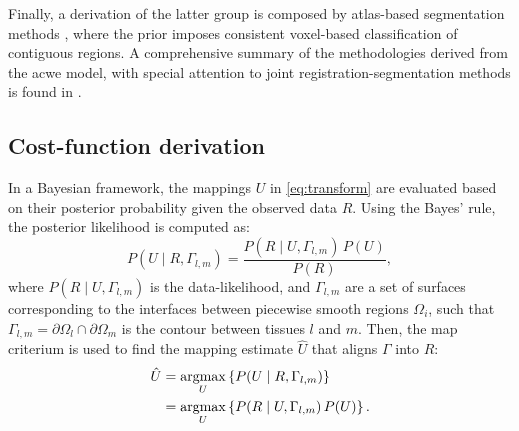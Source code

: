 Finally, a derivation of the latter group is composed by atlas-based segmentation methods
  \citep{gorthi_segmentation_2009,gorthi_active_2011,pohl_unifying_2005,pohl_bayesian_2006,
  wang_joint_2006}, where the prior imposes consistent voxel-based classification of contiguous
  regions.
A comprehensive summary of the methodologies derived from the \acrlong{acwe} model, with special attention
  to joint registration-segmentation methods is found in \citep{gorthi_active_2011}.

\subsection{Cost-function derivation}
\label{sec:methods_map}

In a Bayesian framework, the mappings $U$ in \autoref{eq:transform} are
  evaluated based on their posterior probability given the observed data
  $R$.
Using the Bayes' rule, the posterior likelihood is computed as:
  \begin{equation}
  P(U \mid R,\Gamma_{l,m}) = \frac{P(R \mid U,\Gamma_{l,m})\, P(U)}{P(R)},
  \label{eq:bayes_rule}
  \end{equation}
  where $P(R \mid U,\Gamma_{l,m})$ is the data-likelihood, and
  $\Gamma_{l,m}$ are a set of surfaces corresponding to the interfaces
  between piecewise smooth regions $\Omega_i$, such that
  $\Gamma_{l,m} = \partial \Omega_l \cap \partial \Omega_m$ is the
  contour between tissues $l$ and $m$.
Then, the \gls*{map} criterium \citep{leemput_automated_1999} is used
  to find the mapping estimate $\hat{U}$ that aligns $\Gamma$ into $R$:
  \begin{align}
  \hat{U} &= \underset{U}{\argmax} \left\{ P(U \mid R,\Gamma_{l,m}) \right\} \notag\\
   &= \underset{U}{\argmax} \left\{ P(R \mid U,\Gamma_{l,m})\, P(U) \right\}.
  \label{eq:map_u}
  \end{align}

